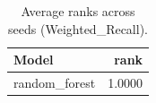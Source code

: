 \begin{table}[t]
\centering
\begin{tabular}{lr}
\toprule
Model & rank \\
\midrule
random_forest & 1.0000 \\
\bottomrule
\end{tabular}
\caption{Average ranks across seeds (Weighted_Recall).}
\label{tab:avg_rank_Weighted_Recall}
\end{table}